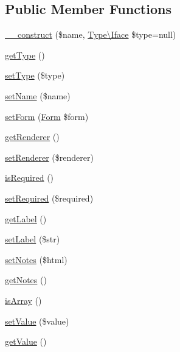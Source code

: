 \subsection*{Public Member Functions}
\begin{DoxyCompactItemize}
\item 
\hyperlink{classTk_1_1Form_1_1Field_1_1Iface_a9453447f3b3bfd3224c405fc7891164f}{\+\_\+\+\_\+construct} (\$name, \hyperlink{classTk_1_1Form_1_1Type_1_1Iface}{Type\textbackslash{}\+Iface} \$type=null)
\item 
\hyperlink{classTk_1_1Form_1_1Field_1_1Iface_aeb681a399b302d8e59c3bfa9ffaad8f6}{get\+Type} ()
\item 
\hyperlink{classTk_1_1Form_1_1Field_1_1Iface_a95d310990b818c6ba2642f7a1d259d17}{set\+Type} (\$type)
\item 
\hyperlink{classTk_1_1Form_1_1Field_1_1Iface_aed87bd5d6a5340110e720eac165e293b}{set\+Name} (\$name)
\item 
\hyperlink{classTk_1_1Form_1_1Field_1_1Iface_a049c1bf0b5dc2ffa86f2a5923da885c4}{set\+Form} (\hyperlink{classTk_1_1Form}{Form} \$form)
\item 
\hyperlink{classTk_1_1Form_1_1Field_1_1Iface_abdf6272573e78a59305eacbe63ff91d8}{get\+Renderer} ()
\item 
\hyperlink{classTk_1_1Form_1_1Field_1_1Iface_a1f31fd814446382b6fdf9b2fda03075d}{set\+Renderer} (\$renderer)
\item 
\hyperlink{classTk_1_1Form_1_1Field_1_1Iface_ad52b8e4418c37eb5fb4647e069342098}{is\+Required} ()
\item 
\hyperlink{classTk_1_1Form_1_1Field_1_1Iface_aa4d7d60b8a821fe4d2c58eb7ed425d1b}{set\+Required} (\$required)
\item 
\hyperlink{classTk_1_1Form_1_1Field_1_1Iface_a2028dc86f15fc36fe16a49947ce37372}{get\+Label} ()
\item 
\hyperlink{classTk_1_1Form_1_1Field_1_1Iface_a1c881f3ad731b280e6ee08e74b53971a}{set\+Label} (\$str)
\item 
\hyperlink{classTk_1_1Form_1_1Field_1_1Iface_a634bd8c5c658bd59d561f412e50d94da}{set\+Notes} (\$html)
\item 
\hyperlink{classTk_1_1Form_1_1Field_1_1Iface_ab1d30e73d0b521e2f6faa175db0ff8ee}{get\+Notes} ()
\item 
\hyperlink{classTk_1_1Form_1_1Field_1_1Iface_aa2c66caa4340ea6d622801621acb6f11}{is\+Array} ()
\item 
\hyperlink{classTk_1_1Form_1_1Field_1_1Iface_a952b97c0a1505dffe1f708cb4b91cc2e}{set\+Value} (\$value)
\item 
\hyperlink{classTk_1_1Form_1_1Field_1_1Iface_a18558c8f8f720774e0eff59d3ced5d30}{get\+Value} ()
\end{DoxyCompactItemize}
